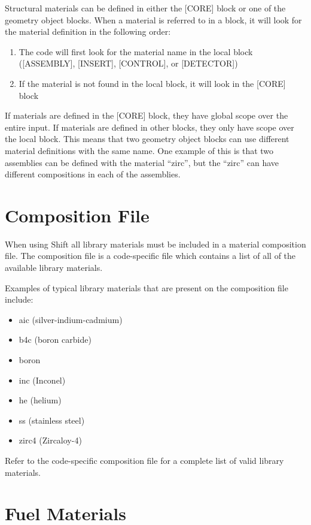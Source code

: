 Structural materials can be defined in either the [CORE] block or one of the
geometry object blocks.  When a material is referred to in a block, it will look
for the material definition in the following order:
\begin{enumerate}  %
 \item The code will first look for the material name in the local block ([ASSEMBLY], [INSERT], [CONTROL], or [DETECTOR])
 \item If the material is not found in the local block, it will look in the [CORE] block
\end{enumerate}

If materials are defined in the [CORE] block, they have global scope over the entire input.
If materials are defined in other blocks, they only have scope over the local block.  This means
that two geometry object blocks can use different material definitions with the same name.
One example of this is that two assemblies can be defined with the material ``zirc'', but
the ``zirc'' can have different compositions in each of the assemblies.

\section{Composition File}

When using Shift all library materials must be included in a material composition file.
The composition file is a code-specific file which contains a list of all
of the available library materials.

Examples of typical library materials that are present on the composition file include:
\begin{itemize}   %
  \item aic (silver-indium-cadmium)
  \item b4c (boron carbide)
  \item boron
  \item inc (Inconel)
  \item he  (helium)
  \item ss  (stainless steel)
  \item zirc4 (Zircaloy-4)
\end{itemize}
Refer to the code-specific composition file for a complete list of valid library materials.

\section{Fuel Materials}

